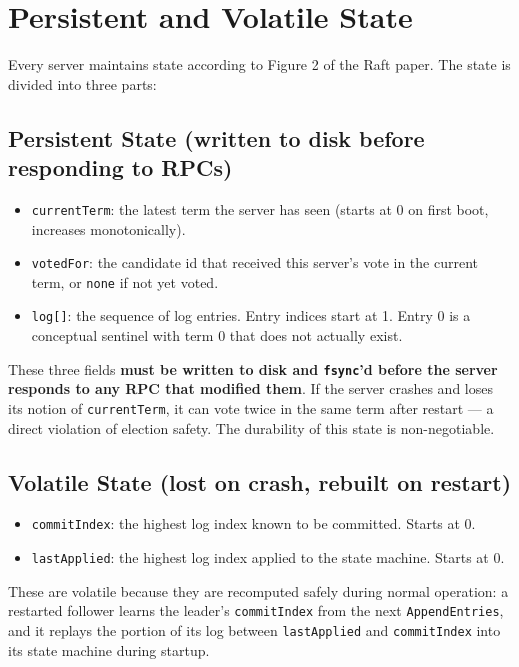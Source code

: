 \documentclass[11pt,a4paper]{article}
\begin{document}
\section{Persistent and Volatile State}

Every server maintains state according to Figure 2 of the Raft paper. The state is divided into three parts:

\subsection{Persistent State (written to disk before responding to RPCs)}
\begin{itemize}
\item \texttt{currentTerm}: the latest term the server has seen (starts at 0 on first boot, increases monotonically).
\item \texttt{votedFor}: the candidate id that received this server's vote in the current term, or \texttt{none} if not yet voted.
\item \texttt{log[]}: the sequence of log entries. Entry indices start at 1. Entry 0 is a conceptual sentinel with term 0 that does not actually exist.
\end{itemize}

These three fields \textbf{must be written to disk and \texttt{fsync}'d before the server responds to any RPC that modified them}. If the server crashes and loses its notion of \texttt{currentTerm}, it can vote twice in the same term after restart --- a direct violation of election safety. The durability of this state is non-negotiable.

\subsection{Volatile State (lost on crash, rebuilt on restart)}
\begin{itemize}
\item \texttt{commitIndex}: the highest log index known to be committed. Starts at 0.
\item \texttt{lastApplied}: the highest log index applied to the state machine. Starts at 0.
\end{itemize}

These are volatile because they are recomputed safely during normal operation: a restarted follower learns the leader's \texttt{commitIndex} from the next \texttt{AppendEntries}, and it replays the portion of its log between \texttt{lastApplied} and \texttt{commitIndex} into its state machine during startup.
\end{document}
